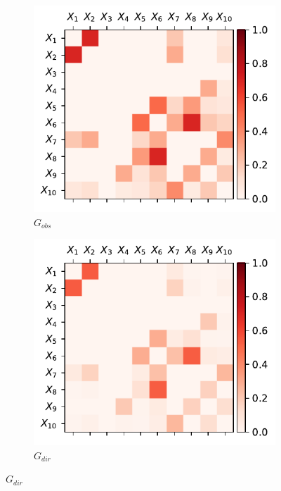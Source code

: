 \documentclass[../Thesis.tex]{subfiles}
\begin{document}
\begin{figure}[H]
    \centering
    \begin{subfigure}[t]{0.49\textwidth}
        \centering
        \includegraphics[width=.95\linewidth]{figures/Gaussian Network Theoretical/symmetric G obs - cor.pdf}
        \caption{$G_{obs}$}
    \end{subfigure}
    \hfill
    \begin{subfigure}[t]{0.49\textwidth}
        \centering
        \includegraphics[width=.95\linewidth]{figures/Gaussian Network Theoretical/G dir from symmetric G obs - cor.pdf}
        \caption{$G_{dir}$}

\end{subfigure}
\end{figure}
\end{document}
